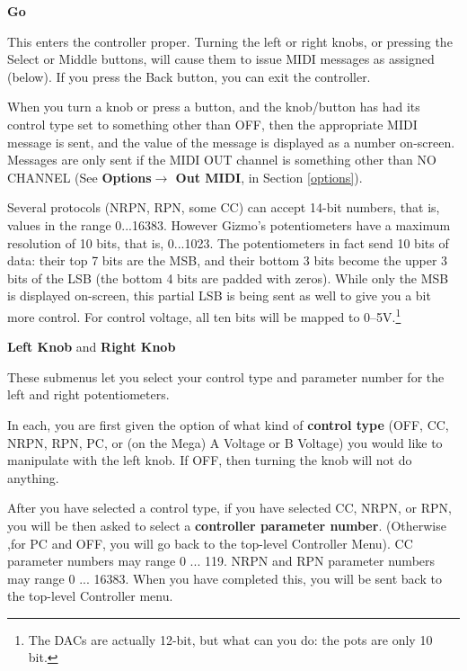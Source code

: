 \documentclass{article}
\begin{document}
	\begin{description}

	\item{\bf Go}
	
	This enters the controller proper.  Turning the left or right knobs, or pressing the Select or Middle buttons, will cause them to issue MIDI messages as assigned (below).  If you press the Back button, you can exit the controller.
	
	When you turn a knob or press a button, and the knob/button has had its control type set to something other than OFF, then the appropriate MIDI message is sent, and the value of the message is displayed as a number on-screen.  Messages are only sent if the MIDI OUT channel is something other than NO CHANNEL (See {\bf Options\(\boldsymbol\rightarrow\) Out MIDI}, in Section \ref{options}).
	
	Several protocols (NRPN, RPN, some CC) can accept 14-bit numbers, that is, values in the range 0...16383.  However Gizmo's potentiometers have a maximum resolution of 10 bits, that is, 0...1023.   The potentiometers in fact send 10 bits of data: their top 7 bits are the MSB, and their bottom 3 bits become the upper 3 bits of the LSB (the bottom 4 bits are padded with zeros).   While only the MSB is displayed on-screen, this partial LSB is being sent as well to give you a bit more control.  For control voltage, all ten bits will be mapped to 0--5V.\footnote{The DACs are actually 12-bit, but what can you do: the pots are only 10 bit.}

	\item{\bf Left Knob} and {\bf Right Knob}
	
	These submenus let you select your control type and parameter number for the left and right potentiometers.
	
	In each, you are first given the option of what kind of {\bf control type} (OFF, CC, NRPN, RPN, PC, or (on the Mega) A Voltage or B Voltage) you would like to manipulate with the left knob.  If OFF, then turning the knob will not do anything.

	After you have selected a control type, if you have selected CC, NRPN, or RPN, you will be then asked to select a {\bf controller parameter number}.  (Otherwise ,for PC and OFF, you will go back to the top-level Controller Menu).  CC parameter numbers may range 0 ... 119.  NRPN and RPN parameter numbers may range 0 ... 16383. When you have completed this, you will be sent back to the top-level Controller menu.


\end{description}
\end{document}

